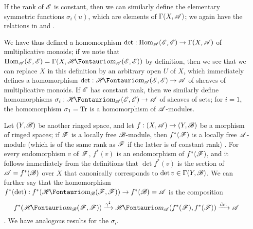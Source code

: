 \begin{env}[6.4.8]
If the rank of $\mathscr{E}$ is constant, then we can similarly define the elementary symmetric functions $\sigma_i(u)$, which are elements of $\Gamma(X,\mathscr{A})$;
we again have the relations in  and .

We have thus defined a homomorphism $\det:\Hom_{\sh{A}}(\sh{E},\sh{E})\to\Gamma(X,\sh{A})$ of multiplicative monoids;
if we note that $\Hom_{\sh{A}}(\sh{E},\sh{E})=\Gamma(X,\shHom_{\sh{A}}(\sh{E},\sh{E}))$ by definition, then we see that we can replace $X$ in this definition by an arbitrary open $U$ of $X$, which immediately defines a homomorphism $\det:\shHom_{\sh{A}}(\sh{E},\sh{E})\to\sh{A}$ of sheaves of multiplicative monoids.
If $\mathscr{E}$ has constant rank, then we similarly define homomorphisms $\sigma_i:\shHom_{\sh{A}}(\sh{E},\sh{E})\to\sh{A}$ of sheaves of sets;
for $i=1$, the homomorphism $\sigma_1=\operatorname{Tr}$ is a homomorphism of $\mathscr{A}$-modules.

Let $(Y,\mathscr{B})$ be another ringed space, and let $f:(X,\sh{A})\to(Y,\sh{B})$ be a morphism of ringed spaces;
if $\mathscr{F}$ is a locally free $\mathscr{B}$-module, then $f^*(\mathscr{F})$ is a locally free $\mathscr{A}$-module (which is of the same rank as $\mathscr{F}$ if the latter is of constant rank) .
For every endomorphism $v$ of $\mathscr{F}$, $f^*(v)$ is an endomorphism of $f^*(\mathscr{F})$, and it follows immediately from the definitions that $\det f^*(v)$ is the section of $\mathscr{A}=f^*(\mathscr{B})$ over $X$ that canonically corresponds to $\det v\in\Gamma(Y,\mathscr{B})$.
We can further say that the homomorphism $f^*(\det):f^*(\shHom_{\sh{B}}(\sh{F},\sh{F}))\to f^*(\sh{B})=\sh{A}$ is the composition
\[
  f^*(\shHom_{\sh{B}}(\sh{F},\sh{F}))
  \xrightarrow{\gamma^\sharp} \shHom_{\sh{A}}(f^*(\sh{F}),f^*(\sh{F}))
  \xrightarrow{\det} \sh{A}
\]
.
We have analogous results for the $\sigma_i$.
\end{env}

